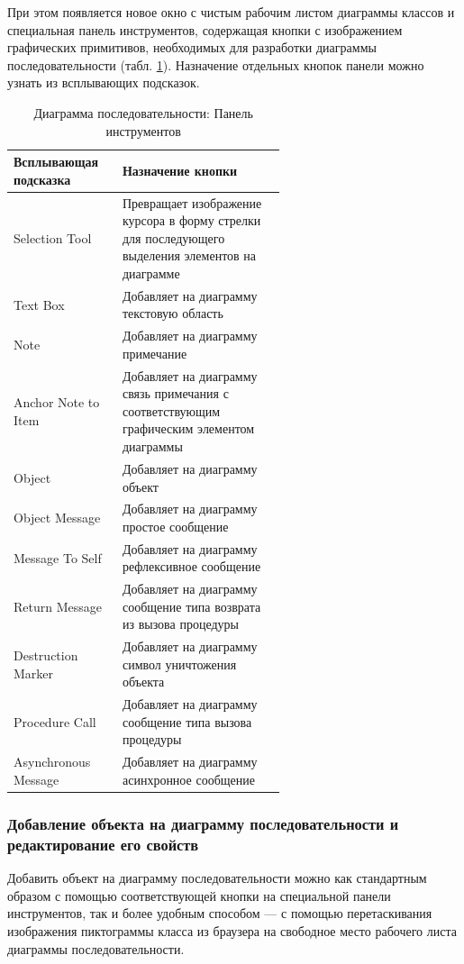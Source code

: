 \documentclass[a4paper,12pt]{extreport}
\begin{document}
При этом появляется новое окно с чистым рабочим листом диаграммы классов и специальная панель инструментов, содержащая кнопки с изображением графических примитивов, необходимых для разработки диаграммы последовательности (табл. \ref{tab:toolboxsequence}). Назначение отдельных кнопок панели можно узнать из всплывающих подсказок.

\begin{table}[h!]
	
	\begin{tabular}{|l|m{0.6\linewidth}|}
		\hline
		\textbf{Всплывающая подсказка}&\textbf{Назначение кнопки} \\ \hline
		Selection Tool&Превращает изображение курсора в форму стрелки для последующего выделения элементов на диаграмме \\ \hline
		Text Box& Добавляет на диаграмму текстовую область \\ \hline
		Note& Добавляет на диаграмму примечание \\ \hline
		Anchor Note to Item & Добавляет на диаграмму связь примечания с соответствующим графическим элементом диаграммы \\ \hline
		Object &Добавляет на диаграмму объект \\ \hline
		Object Message& Добавляет на диаграмму простое сообщение \\ \hline
		Message To Self&Добавляет на диаграмму рефлексивное сообщение \\ \hline
		Return Message&Добавляет на диаграмму сообщение типа возврата из вызова процедуры \\ \hline
		Destruction Marker&Добавляет на диаграмму символ уничтожения объекта \\ \hline
		Procedure Call&Добавляет на диаграмму сообщение типа вызова процедуры \\ \hline
		Asynchronous Message&Добавляет на диаграмму асинхронное сообщение  \\ \hline
	\end{tabular}
	\caption{Диаграмма последовательности: Панель инструментов}
	\label{tab:toolboxsequence}
\end{table}

\subsubsection*{Добавление объекта на диаграмму последовательности и редактирование его свойств}
Добавить объект на диаграмму последовательности можно как стандартным образом с помощью соответствующей кнопки на специальной панели инструментов, так и более удобным способом --- с помощью перетаскивания изображения пиктограммы класса из браузера на свободное место рабочего листа диаграммы последовательности.
\end{document}
